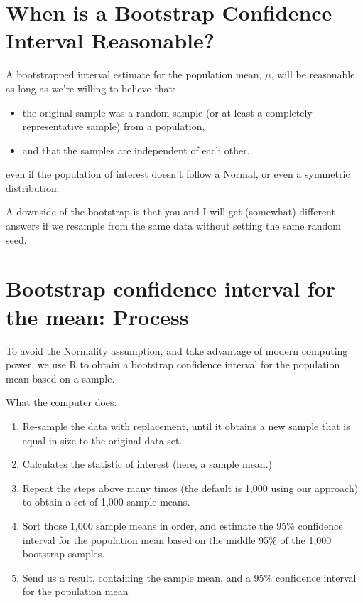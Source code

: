 \documentclass[
]{book}
\providecommand{\tightlist}{%
  \setlength{\itemsep}{0pt}\setlength{\parskip}{0pt}}
\begin{document}
\hypertarget{when-is-a-bootstrap-confidence-interval-reasonable}{%
\section{When is a Bootstrap Confidence Interval Reasonable?}\label{when-is-a-bootstrap-confidence-interval-reasonable}}

A bootstrapped interval estimate for the population mean, \(\mu\), will be reasonable as long as we're willing to believe that:

\begin{itemize}
\tightlist
\item
  the original sample was a random sample (or at least a completely representative sample) from a population,
\item
  and that the samples are independent of each other,
\end{itemize}

even if the population of interest doesn't follow a Normal, or even a symmetric distribution.

A downside of the bootstrap is that you and I will get (somewhat) different answers if we resample from the same data without setting the same random seed.

\hypertarget{bootstrap-confidence-interval-for-the-mean-process}{%
\section{Bootstrap confidence interval for the mean: Process}\label{bootstrap-confidence-interval-for-the-mean-process}}

To avoid the Normality assumption, and take advantage of modern computing power, we use R to obtain a bootstrap confidence interval for the population mean based on a sample.

What the computer does:

\begin{enumerate}
\def\labelenumi{\arabic{enumi}.}
\tightlist
\item
  Re-sample the data with replacement, until it obtains a new sample that is equal in size to the original data set.
\item
  Calculates the statistic of interest (here, a sample mean.)
\item
  Repeat the steps above many times (the default is 1,000 using our approach) to obtain a set of 1,000 sample means.
\item
  Sort those 1,000 sample means in order, and estimate the 95\% confidence interval for the population mean based on the middle 95\% of the 1,000 bootstrap samples.
\item
  Send us a result, containing the sample mean, and a 95\% confidence interval for the population mean
\end{enumerate}
\end{document}
